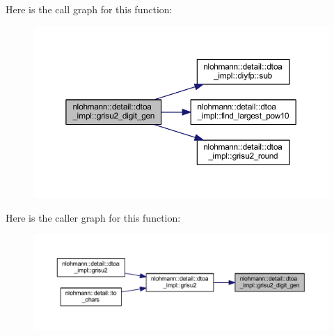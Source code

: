 Here is the call graph for this function\+:
\nopagebreak
\begin{figure}[H]
\begin{center}
\leavevmode
\includegraphics[width=350pt]{namespacenlohmann_1_1detail_1_1dtoa__impl_a9b899c72b0e1e3dd46d75c2b4e6bcdfb_cgraph}
\end{center}
\end{figure}
Here is the caller graph for this function\+:
\nopagebreak
\begin{figure}[H]
\begin{center}
\leavevmode
\includegraphics[width=350pt]{namespacenlohmann_1_1detail_1_1dtoa__impl_a9b899c72b0e1e3dd46d75c2b4e6bcdfb_icgraph}
\end{center}
\end{figure}
\mbox{\label{namespacenlohmann_1_1detail_1_1dtoa__impl_a5bc841e0bee12fd6489d49cf7bd07bb4}} 
